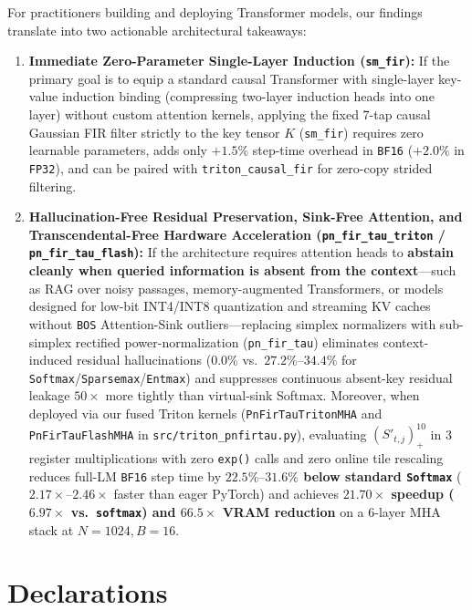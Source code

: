 \documentclass[11pt,a4paper]{article}
\begin{document}
For practitioners building and deploying Transformer models, our findings translate into two actionable architectural takeaways:
\begin{enumerate}
\item \textbf{Immediate Zero-Parameter Single-Layer Induction (\texttt{sm\_fir}):} If the primary goal is to equip a standard causal Transformer with single-layer key-value induction binding (compressing two-layer induction heads into one layer) without custom attention kernels, applying the fixed 7-tap causal Gaussian FIR filter strictly to the key tensor $K$ (\texttt{sm\_fir}) requires zero learnable parameters, adds only $+1.5\%$ step-time overhead in \texttt{BF16} ($+2.0\%$ in \texttt{FP32}), and can be paired with \texttt{triton\_causal\_fir} for zero-copy strided filtering.
\item\sloppy \textbf{Hallucination-Free Residual Preservation, Sink-Free Attention, and Transcendental-Free Hardware Acceleration (\texttt{pn\_fir\_tau\_triton} / \texttt{pn\_fir\_tau\_flash}):} If the architecture requires attention heads to \textbf{abstain cleanly when queried information is absent from the context}---such as RAG over noisy passages, memory-augmented Transformers, or models designed for low-bit INT4/INT8 quantization and streaming KV caches without \texttt{BOS} Attention-Sink outliers---replacing simplex normalizers with sub-simplex rectified power-normalization (\texttt{pn\_fir\_tau}) eliminates context-induced residual hallucinations ($0.0\%$ vs.\ $27.2\%\text{--}34.4\%$ for \texttt{Softmax}/\texttt{Sparsemax}/\texttt{Entmax}) and suppresses continuous absent-key residual leakage $50\times$ more tightly than virtual-sink Softmax. Moreover, when deployed via our fused Triton kernels (\texttt{PnFirTauTritonMHA} and \texttt{PnFirTauFlashMHA} in \texttt{src/triton\_pnfirtau.py}), evaluating $(S'_{t,j})_+^{10}$ in 3 register multiplications with zero \texttt{exp()} calls and zero online tile rescaling reduces full-LM \texttt{BF16} step time by \textbf{$22.5\%\text{--}31.6\%$ below standard \texttt{Softmax}} ($2.17\times\text{--}2.46\times$ faster than eager PyTorch) and achieves \textbf{$21.70\times$ speedup ($6.97\times$ vs.\ \texttt{softmax}) and $66.5\times$ VRAM reduction} on a 6-layer MHA stack at $N=1024, B=16$.
\end{enumerate}

\section*{Declarations}
\end{document}
